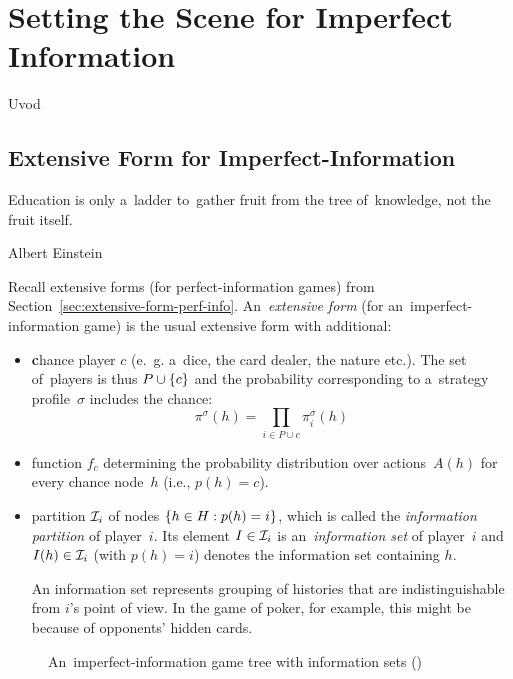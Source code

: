 \chapter{Setting the Scene for Imperfect Information}
\label{ch:imperf-intro}
\todo Uvod

\section{Extensive Form for Imperfect-Information}
\label{sec:extensive-form-imperf-info}
\epigraph{
  Education is only a~ladder to~gather fruit from the tree of~knowledge, not the fruit itself.
}{Albert Einstein}
Recall extensive forms (for perfect-information games) from Section~\ref{sec:extensive-form-perf-info}.
An~\emph{extensive form} (for an~imperfect-information game) is the usual extensive form with additional:
\begin{itemize}
  \item \textbf{c}hance player $c$ (e.~g. a~dice, the card dealer, the nature etc.).
    The set of~players is thus $P \cup \left\{ c \right\}$ and the probability corresponding to a~strategy profile~$\sigma$ includes the chance:
    \[\pi ^\sigma(h) = \prod _{i \in P \cup {c}} \pi _i ^\sigma (h)\]

  \item function $f_c$ determining the probability distribution over actions~$A(h)$ for every chance node~$h$ (i.e., $p(h) = c$).

  \item partition $\mathcal{I}_i$ of nodes $\left\{ h \in H: p(h) = i \right\}$, which is called the \emph{information partition} of player~$i$.
    Its element $I \in \mathcal{I}_i$ is an~\emph{information set} of player~$i$ and $I(h) \in \mathcal{I}_i$ (with $p(h) = i$) denotes the information set containing $h$.

    An information set represents grouping of histories that are indistinguishable from $i$'s point of view.
    In the game of poker, for example, this might be because of  opponents' hidden cards.
\end{itemize}
\noindent
\begin{figure}[H]
  \centering
  \scriptsize
  \def\svgwidth{.7\textwidth}
  
  \def\captionTitle{An~imperfect-information game tree with information sets}
  \caption[\captionTitle]{\captionTitle{} (\cite[p.~67]{AGT07})}
  \label{fig:strategic-form-tree}
\end{figure}
